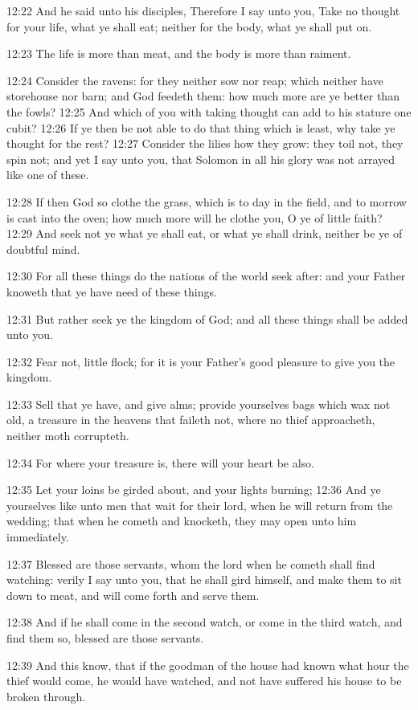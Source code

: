 12:22 And he said unto his disciples, Therefore I say unto you, Take no thought for your life, what ye shall eat; neither for the body, what ye shall put on.

12:23 The life is more than meat, and the body is more than raiment.

12:24 Consider the ravens: for they neither sow nor reap; which neither have storehouse nor barn; and God feedeth them: how much more are ye better than the fowls?  12:25 And which of you with taking thought can add to his stature one cubit?  12:26 If ye then be not able to do that thing which is least, why take ye thought for the rest?  12:27 Consider the lilies how they grow: they toil not, they spin not; and yet I say unto you, that Solomon in all his glory was not arrayed like one of these.

12:28 If then God so clothe the grass, which is to day in the field, and to morrow is cast into the oven; how much more will he clothe you, O ye of little faith?  12:29 And seek not ye what ye shall eat, or what ye shall drink, neither be ye of doubtful mind.

12:30 For all these things do the nations of the world seek after: and your Father knoweth that ye have need of these things.

12:31 But rather seek ye the kingdom of God; and all these things shall be added unto you.

12:32 Fear not, little flock; for it is your Father's good pleasure to give you the kingdom.

12:33 Sell that ye have, and give alms; provide yourselves bags which wax not old, a treasure in the heavens that faileth not, where no thief approacheth, neither moth corrupteth.

12:34 For where your treasure is, there will your heart be also.

12:35 Let your loins be girded about, and your lights burning; 12:36 And ye yourselves like unto men that wait for their lord, when he will return from the wedding; that when he cometh and knocketh, they may open unto him immediately.

12:37 Blessed are those servants, whom the lord when he cometh shall find watching: verily I say unto you, that he shall gird himself, and make them to sit down to meat, and will come forth and serve them.

12:38 And if he shall come in the second watch, or come in the third watch, and find them so, blessed are those servants.

12:39 And this know, that if the goodman of the house had known what hour the thief would come, he would have watched, and not have suffered his house to be broken through.

